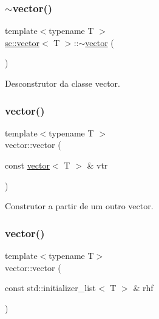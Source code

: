 \subsubsection{\texorpdfstring{$\sim$vector()}{~vector()}}
{\footnotesize\ttfamily template$<$typename T $>$ \\
\hyperlink{classsc_1_1vector}{sc\+::vector}$<$ T $>$\+::$\sim$\hyperlink{classsc_1_1vector}{vector} (\begin{DoxyParamCaption}{ }\end{DoxyParamCaption})}



Desconstrutor da classe vector. 

\mbox{\label{classsc_1_1vector_ac138a82e58bbe44d65197b820637003b}} 
\subsubsection{\texorpdfstring{vector()}{vector()}\hspace{0.1cm}{\footnotesize\ttfamily [2/5]}}
{\footnotesize\ttfamily template$<$typename T $>$ \\
vector\+::vector (\begin{DoxyParamCaption}\item[{const \hyperlink{classsc_1_1vector}{vector}$<$ T $>$ \&}]{vtr }\end{DoxyParamCaption})}



Construtor a partir de um outro vector. 

\mbox{\label{classsc_1_1vector_a18854e08d7337a72092ff5f41ddf666f}} 
\subsubsection{\texorpdfstring{vector()}{vector()}\hspace{0.1cm}{\footnotesize\ttfamily [3/5]}}
{\footnotesize\ttfamily template$<$typename T$>$ \\
vector\+::vector (\begin{DoxyParamCaption}\item[{const std\+::initializer\+\_\+list$<$ T $>$ \&}]{rhf }\end{DoxyParamCaption})}



